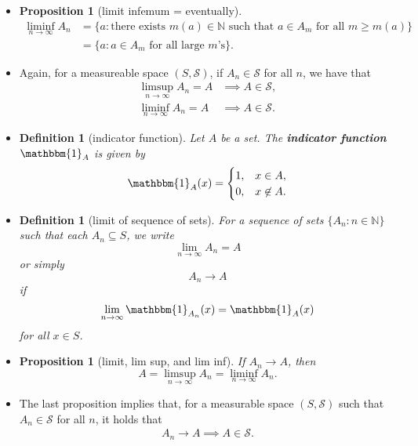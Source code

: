 \documentclass[10pt]{article}
\newtheorem{definition}[lemma]{Definition}
\newtheorem{proposition}[lemma]{Proposition}
\numberwithin{lemma}{section}
\newcommand{\mcal}[1]{\mathcal{#1}}
\newcommand{\Nat}{\mathbb{N}}
\begin{document}
\begin{itemize}
  \item \begin{proposition}[limit infemum = eventually]
    \begin{align*}
      \liminf_{n \rightarrow \infty} A_n
      &= \{ a : \mbox{there exists $m(a) \in \Nat$ such that $a \in A_{m}$ for all $m \geq m(a)$}\} \\
      &= \{ a : \mbox{$a \in A_m$ for all large $m$'s}\}.
    \end{align*}
  \end{proposition}

  \item Again, for a measureable space $(S, \mcal{S})$, if $A_n \in \mcal{S}$ for all $n$, we have that
  \begin{align*}
    \limsup_{n \rightarrow \infty} A_n = A &\implies A \in \mcal{S}, \\
    \liminf_{n \rightarrow \infty} A_n = A &\implies A \in \mcal{S}.
  \end{align*}

  \item \begin{definition}[indicator function]
    Let $A$ be a set. The {\bf indicator function} $\mathbbm{1}_A$ is given by
    \begin{align*}
      \mathbbm{1}_A(x) = \begin{cases}
        1, & x \in A, \\
        0, & x \not\in A.
      \end{cases}
    \end{align*}
  \end{definition}

  \item \begin{definition}[limit of sequence of sets]
    For a sequence of sets $\{ A_n : n \in \Nat \}$ such that each $A_n \subseteq S$, we write
    $$\lim_{n \rightarrow \infty} A_n = A$$
    or simply
    $$A_n \rightarrow A$$
    if
    $$\lim_{n \rightarrow \infty} \mathbbm{1}_{A_n}(x) = \mathbbm{1}_{A}(x)$$
    for all $x \in S$.
  \end{definition}

  \item \begin{proposition}[limit, lim sup, and lim inf]
    If $A_n \rightarrow A$, then $$A = \limsup_{n\rightarrow \infty} A_n = \liminf_{n \rightarrow \infty} A_n.$$
  \end{proposition}
  \item The last proposition implies that, for a measurable space $(S, \mcal{S})$ such that $A_n \in \mcal{S}$ for all $n$, it holds that
  \begin{align*}
    A_n \rightarrow A \implies A \in \mcal{S}.
  \end{align*}
\end{itemize}
\end{document}
